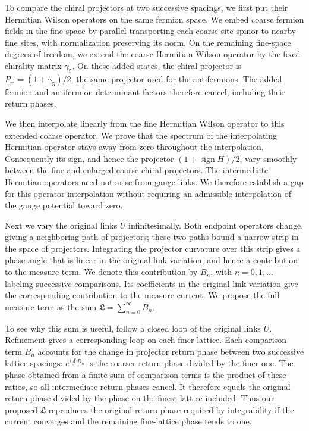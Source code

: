 \documentclass[11pt,a4paper]{article}
\theoremstyle{remark}
\begin{document}
To compare the chiral projectors at two successive spacings, we first put their Hermitian Wilson operators on the same fermion space. We embed coarse fermion fields in the fine space by parallel-transporting each coarse-site spinor to nearby fine sites, with normalization preserving its norm. On the remaining fine-space degrees of freedom, we extend the coarse Hermitian Wilson operator by the fixed chirality matrix $\gamma_5$. On these added states, the chiral projector is $P_+=(1+\gamma_5)/2$, the same projector used for the antifermions. The added fermion and antifermion determinant factors therefore cancel, including their return phases.

We then interpolate linearly from the fine Hermitian Wilson operator to this extended coarse operator. We prove that the spectrum of the interpolating Hermitian operator stays away from zero throughout the interpolation. Consequently its sign, and hence the projector $(1+\operatorname{sign}H)/2$, vary smoothly between the fine and enlarged coarse chiral projectors. The intermediate Hermitian operators need not arise from gauge links. We therefore establish a gap for this operator interpolation without requiring an admissible interpolation of the gauge potential toward zero.

Next we vary the original links $U$ infinitesimally. Both endpoint operators change, giving a neighboring path of projectors; these two paths bound a narrow strip in the space of projectors. Integrating the projector curvature over this strip gives a phase angle that is linear in the original link variation, and hence a contribution to the measure term. We denote this contribution by $B_n$, with $n=0,1,\ldots$ labeling successive comparisons. Its coefficients in the original link variation give the corresponding contribution to the measure current. We propose the full measure term as the sum $\mathfrak L=\sum_{n=0}^{\infty}B_n$.

To see why this sum is useful, follow a closed loop of the original links $U$. Refinement gives a corresponding loop on each finer lattice. Each comparison term $B_n$ accounts for the change in projector return phase between two successive lattice spacings: $e^{i\oint B_n}$ is the coarser return phase divided by the finer one. The phase obtained from a finite sum of comparison terms is the product of these ratios, so all intermediate return phases cancel. It therefore equals the original return phase divided by the phase on the finest lattice included. Thus our proposed $\mathfrak L$ reproduces the original return phase required by integrability if the current converges and the remaining fine-lattice phase tends to one.
\end{document}
